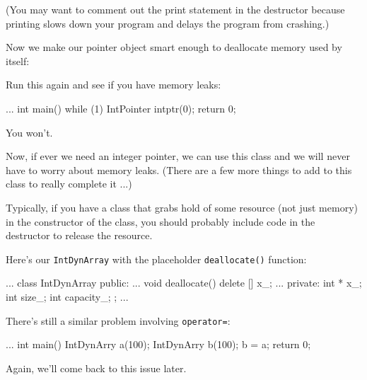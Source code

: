 (You may want to comment out the print statement in the destructor
because printing slows down your program and delays the program from
crashing.)

Now we make our pointer object smart enough to deallocate memory used by
itself:

\begin{consolethree}[escapeinside=||]
...
class IntPointer
{
public:
    ...
    ~IntPointer()
    {
        delete p_;
    }
    ...
\end{consolethree}

Run this again and see if you have memory leaks:

\begin{consolethree}[escapeinside=||]
...
int main()
{
    while (1)
    {
        IntPointer intptr(0);
    }
    return 0;
}
\end{consolethree}

You won't.

Now, if ever we need an integer pointer, we can use this class and we
will never have to worry about memory leaks. (There are a few more
things to add to this class to really complete it ...)

Typically, if you have a class that grabs hold of some resource (not
just memory) in the constructor of the class, you should probably
include code in the destructor to release the resource.




\newpage{}

Here's our \texttt{IntDynArray} with the placeholder
\texttt{deallocate()} function:

\begin{consolethree}[escapeinside=||]
...
class IntDynArray
{
public:
    ...
    void deallocate()
    {
        delete [] x_;
    }
    ...
private:
    int * x_;
    int size_;
    int capacity_;
};
...
\end{consolethree}


There's still a similar problem involving
\texttt{operator=}:

\begin{consolethree}[escapeinside=||]
...
int main()
{
    IntDynArry a(100);
    IntDynArry b(100);
    b = a;
    return 0;
}
\end{consolethree}

Again, we'll come back to this issue later.


